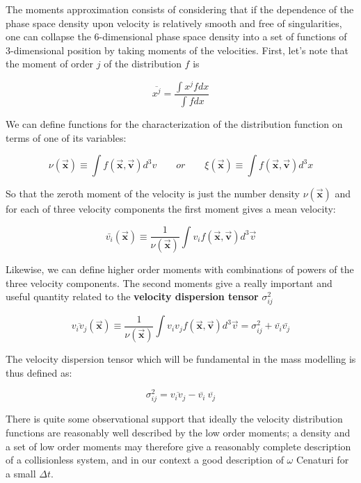 The moments approximation consists of considering that if the dependence of the phase space density upon velocity is relatively smooth and free of singularities, one can collapse the 6-dimensional phase space density into a set of functions of 3-dimensional position by taking moments of the velocities. First, let's note that the moment of order $j$ of the distribution $f$ is

\begin{equation}
\overline{x^{j}}=\frac {\int x^{j}fdx}{\int fdx}
\end{equation}

We can define functions for the characterization of the distribution function on terms of one of its variables:

\begin{equation}
\nu(\vec{\textbf{x}})\equiv \int f(\vec{\textbf{x}},\vec{\textbf{v}})d^{3}v\quad\quad or \quad\quad  \xi(\vec{\textbf{x}})\equiv \int f(\vec{\textbf{x}},\vec{\textbf{v}})d^{3}x
\end{equation}

So that the zeroth moment of the velocity is just the number density $\nu(\vec{\textbf{x}})$ and for each of three velocity components the first moment gives a mean velocity:

\begin{equation}
\bar{v_{i}}(\vec{\textbf{x}})\equiv \frac{1}{\nu(\vec{\textbf{x}})}\int v_{i}f(\vec{\textbf{x}},\vec{\textbf{v}})d^{3}\vec{v}
\end{equation}

Likewise, we can define higher order moments with combinations of powers of the three velocity components. The second moments give a really important and useful quantity related to the \textbf{velocity dispersion tensor} $\sigma^{2}_{ij}$

\begin{equation}
\overline{v_{i}v_{j}}(\vec{\textbf{x}})\equiv \frac{1}{\nu(\vec{\textbf{x}})}\int v_{i}v_{j}f(\vec{\textbf{x}},\vec{\textbf{v}})d^{3}\vec{v}=\sigma^{2}
_{ij}+\bar{v_{i}}\bar{v_{j}}
\end{equation}

The velocity dispersion tensor which will be fundamental in the mass modelling is thus defined as:

\begin{equation}
\sigma_{ij}^{2}=\overline{v_{i}v_{j}}-\overline{v_{i}}\:\overline{v_{j}}
\end{equation}

There is quite some observational support that ideally the velocity distribution functions are reasonably well described by the low order moments; a density and a set of low order moments may therefore give a reasonably complete description of a collisionless system, and in our context a good description of $\omega$ Cenaturi for a small $\Delta t$. 

